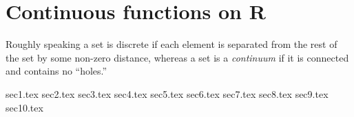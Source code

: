 \chapter{Continuous functions on R}\label{i:ch:9}

\begin{note}
  Roughly speaking a set is discrete if each element is separated from the rest of the set by some non-zero distance, whereas a set is a \emph{continuum} if it is connected and contains no ``holes.''
\end{note}

{sec1.tex}
{sec2.tex}
{sec3.tex}
{sec4.tex}
{sec5.tex}
{sec6.tex}
{sec7.tex}
{sec8.tex}
{sec9.tex}
{sec10.tex}
